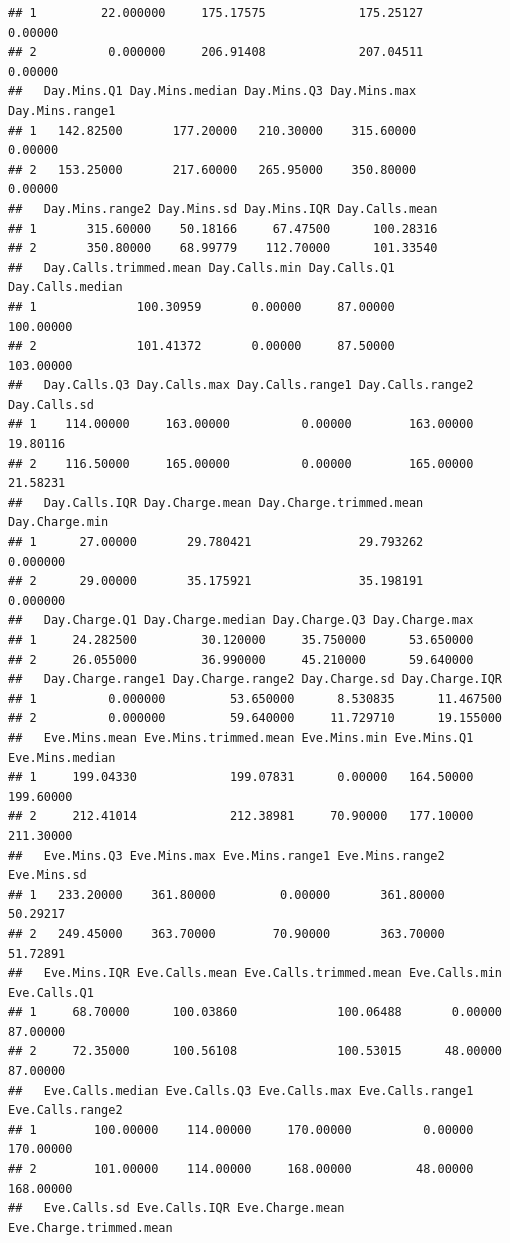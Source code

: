 \documentclass{article}\usepackage[]{graphicx}\usepackage[]{color}
\makeatletter
\newenvironment{kframe}{%
 \def\at@end@of@kframe{}%
 \ifinner\ifhmode%
  \def\at@end@of@kframe{\end{minipage}}%
  \begin{minipage}{\columnwidth}%
 \fi\fi%
 \def\FrameCommand##1{\hskip\@totalleftmargin \hskip-\fboxsep
 \colorbox{shadecolor}{##1}\hskip-\fboxsep
     \hskip-\linewidth \hskip-\@totalleftmargin \hskip\columnwidth}%
 \MakeFramed {\advance\hsize-\width
   \@totalleftmargin\z@ \linewidth\hsize
   \@setminipage}}%
 {\par\unskip\endMakeFramed%
 \at@end@of@kframe}
\newenvironment{knitrout}{}{} %
\makeatother
\begin{document}
\begin{description}
\begin{knitrout}
\begin{kframe}
\begin{verbatim}
## 1         22.000000     175.17575             175.25127      0.00000
## 2          0.000000     206.91408             207.04511      0.00000
##   Day.Mins.Q1 Day.Mins.median Day.Mins.Q3 Day.Mins.max Day.Mins.range1
## 1   142.82500       177.20000   210.30000    315.60000         0.00000
## 2   153.25000       217.60000   265.95000    350.80000         0.00000
##   Day.Mins.range2 Day.Mins.sd Day.Mins.IQR Day.Calls.mean
## 1       315.60000    50.18166     67.47500      100.28316
## 2       350.80000    68.99779    112.70000      101.33540
##   Day.Calls.trimmed.mean Day.Calls.min Day.Calls.Q1 Day.Calls.median
## 1              100.30959       0.00000     87.00000        100.00000
## 2              101.41372       0.00000     87.50000        103.00000
##   Day.Calls.Q3 Day.Calls.max Day.Calls.range1 Day.Calls.range2 Day.Calls.sd
## 1    114.00000     163.00000          0.00000        163.00000     19.80116
## 2    116.50000     165.00000          0.00000        165.00000     21.58231
##   Day.Calls.IQR Day.Charge.mean Day.Charge.trimmed.mean Day.Charge.min
## 1      27.00000       29.780421               29.793262       0.000000
## 2      29.00000       35.175921               35.198191       0.000000
##   Day.Charge.Q1 Day.Charge.median Day.Charge.Q3 Day.Charge.max
## 1     24.282500         30.120000     35.750000      53.650000
## 2     26.055000         36.990000     45.210000      59.640000
##   Day.Charge.range1 Day.Charge.range2 Day.Charge.sd Day.Charge.IQR
## 1          0.000000         53.650000      8.530835      11.467500
## 2          0.000000         59.640000     11.729710      19.155000
##   Eve.Mins.mean Eve.Mins.trimmed.mean Eve.Mins.min Eve.Mins.Q1 Eve.Mins.median
## 1     199.04330             199.07831      0.00000   164.50000       199.60000
## 2     212.41014             212.38981     70.90000   177.10000       211.30000
##   Eve.Mins.Q3 Eve.Mins.max Eve.Mins.range1 Eve.Mins.range2 Eve.Mins.sd
## 1   233.20000    361.80000         0.00000       361.80000    50.29217
## 2   249.45000    363.70000        70.90000       363.70000    51.72891
##   Eve.Mins.IQR Eve.Calls.mean Eve.Calls.trimmed.mean Eve.Calls.min Eve.Calls.Q1
## 1     68.70000      100.03860              100.06488       0.00000     87.00000
## 2     72.35000      100.56108              100.53015      48.00000     87.00000
##   Eve.Calls.median Eve.Calls.Q3 Eve.Calls.max Eve.Calls.range1 Eve.Calls.range2
## 1        100.00000    114.00000     170.00000          0.00000        170.00000
## 2        101.00000    114.00000     168.00000         48.00000        168.00000
##   Eve.Calls.sd Eve.Calls.IQR Eve.Charge.mean Eve.Charge.trimmed.mean

\end{verbatim}
\end{kframe}
\end{knitrout}
\end{description}
\end{document}
